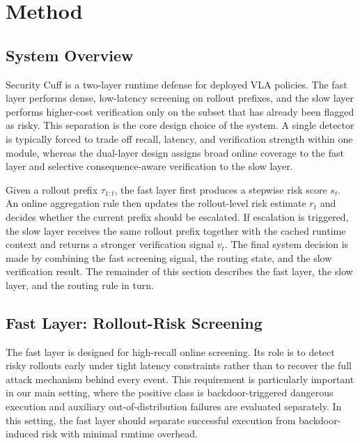\section{Method}
\label{sec:method}

\subsection{System Overview}

Security Cuff is a two-layer runtime defense for deployed VLA
policies.
The fast layer performs dense, low-latency screening on rollout
prefixes, and the slow layer performs higher-cost verification only on
the subset that has already been flagged as risky.
This separation is the core design choice of the system.
A single detector is typically forced to trade off recall, latency, and
verification strength within one module, whereas the dual-layer design
assigns broad online coverage to the fast layer and selective
consequence-aware verification to the slow layer.

Given a rollout prefix $\tau_{1:t}$, the fast layer first produces a
stepwise risk score $s_t$.
An online aggregation rule then updates the rollout-level risk estimate
$r_t$ and decides whether the current prefix should be escalated.
If escalation is triggered, the slow layer receives the same rollout
prefix together with the cached runtime context and returns a stronger
verification signal $v_t$.
The final system decision is made by combining the fast screening
signal, the routing state, and the slow verification result.
The remainder of this section describes the fast layer, the slow layer,
and the routing rule in turn.

\subsection{Fast Layer: Rollout-Risk Screening}

The fast layer is designed for high-recall online screening.
Its role is to detect risky rollouts early under tight latency
constraints rather than to recover the full attack mechanism behind
every event.
This requirement is particularly important in our main setting, where
the positive class is backdoor-triggered dangerous execution and
auxiliary out-of-distribution failures are evaluated separately.
In this setting, the fast layer should separate successful execution
from backdoor-induced risk with minimal runtime overhead.

